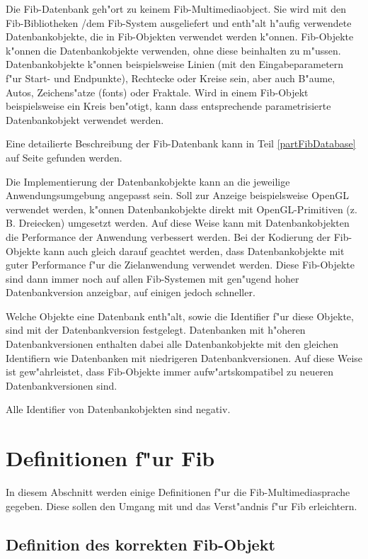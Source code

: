 Die Fib-Datenbank geh"ort zu keinem Fib-Multimediaobject. Sie wird mit den Fib-Bib\-lio\-the\-ken /dem Fib-System ausgeliefert und enth"alt h"aufig verwendete Datenbankobjekte, die in Fib-Objekten verwendet werden k"onnen. Fib-Objekte k"onnen die Datenbankobjekte verwenden, ohne diese beinhalten zu m"ussen. Datenbankobjekte k"onnen beispielsweise Linien (mit den Eingabeparametern f"ur Start- und Endpunkte), Recht\-ecke oder Kreise sein, aber auch B"aume, Autos, Zeichens"atze (fonts) oder Fraktale. Wird in einem Fib-Objekt beispielsweise ein Kreis ben"otigt, kann dass entsprechende parametrisierte Datenbankobjekt verwendet werden.

Eine detailierte Beschreibung der Fib-Datenbank kann in Teil \ref{partFibDatabase} auf Seite \pageref{partFibDatabase} gefunden werden.

Die Implementierung der Datenbankobjekte kann an die jeweilige Anwendungsumgebung angepasst sein. Soll zur Anzeige beispielsweise OpenGL verwendet werden, k"onnen Datenbankobjekte direkt mit OpenGL-Primitiven (z. B. Dreiecken) umgesetzt werden. Auf diese Weise kann mit Datenbankobjekten die Performance der Anwendung verbessert werden. Bei der Kodierung der Fib-Objekte kann auch gleich darauf geachtet werden, dass Datenbankobjekte mit guter Performance f"ur die Zielanwendung verwendet werden. Diese Fib-Objekte sind dann immer noch auf allen Fib-Systemen mit gen"ugend hoher Datenbankversion anzeigbar, auf einigen jedoch schneller.

Welche Objekte eine Datenbank enth"alt, sowie die Identifier f"ur diese Objekte, sind mit der Datenbankversion festgelegt. Datenbanken mit h"oheren Datenbankversionen enthalten dabei alle Datenbankobjekte mit den gleichen Identifiern wie Datenbanken mit niedrigeren Datenbankversionen. Auf diese Weise ist gew"ahrleistet, dass Fib-Objekte immer aufw"artskompatibel zu neueren Datenbankversionen sind.

Alle Identifier von Datenbankobjekten sind negativ.



\section{Definitionen f"ur Fib}
\label{secDefinitionsForFib}

In diesem Abschnitt werden einige Definitionen f"ur die Fib-Multimediasprache gegeben. Diese sollen den Umgang mit und das Verst"andnis f"ur Fib erleichtern.

\subsection{Definition des korrekten Fib-Objekt}

